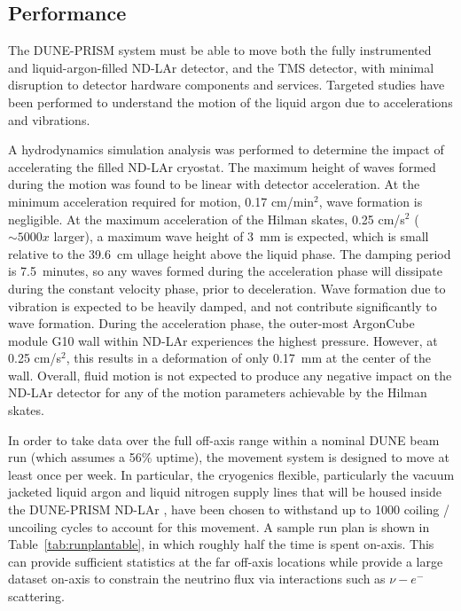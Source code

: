 
\subsection{Performance}
\label{sec:prism-ovvw-perf}

The DUNE-PRISM system must be able to move both the fully instrumented and liquid-argon-filled ND-LAr detector, and the TMS detector, with minimal disruption to detector hardware components and services. Targeted studies have been performed to understand the motion of the liquid argon due to accelerations and vibrations. 

A hydrodynamics simulation analysis was performed to determine the impact of accelerating the filled ND-LAr cryostat. The maximum height of waves formed during the motion was found to be linear with detector acceleration. At the minimum acceleration required for motion, 0.17 cm/min$^2$, wave formation is negligible. At the maximum acceleration of the Hilman skates, 0.25 cm/s$^2$ ($\sim 5000 x$ larger), a maximum wave height of 3~mm is expected, which is small relative to the 39.6~cm ullage height above the liquid phase. The damping period is 7.5~minutes, so any waves formed during the acceleration phase will dissipate during the constant velocity phase, prior to deceleration. Wave formation due to vibration is expected to be heavily damped, and not contribute significantly to wave formation. During the acceleration phase, the outer-most ArgonCube module G10 wall within ND-LAr experiences the highest pressure. However, at 0.25 cm/s$^2$, this results in a deformation of only 0.17~mm at the center of the wall. Overall, fluid motion is not expected to produce any negative impact on the ND-LAr detector for any of the motion parameters achievable by the Hilman skates.

In order to take data over the full off-axis range within a nominal DUNE beam run (which assumes a 56\% uptime), the movement system is designed to move at least once per week. In particular, the cryogenics flexible, particularly the vacuum jacketed liquid argon and liquid nitrogen supply lines that will be housed inside the DUNE-PRISM ND-LAr , have been chosen to withstand up to 1000 coiling / uncoiling cycles to account for this movement.
A sample run plan is shown in Table~\ref{tab:runplantable}, in which roughly half the time is spent on-axis. This can provide sufficient statistics at the far off-axis locations while provide a large dataset on-axis to constrain the neutrino flux via interactions such as $\nu-e^-$ scattering.

